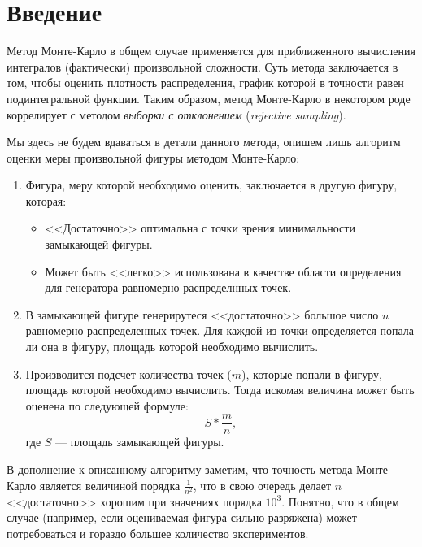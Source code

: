 \section{Введение}

Метод Монте-Карло в общем случае применяется для приближенного вычисления интегралов (фактически) произвольной сложности. Суть метода
заключается в том, чтобы оценить плотность распределения, график которой в точности равен подинтегральной функции. Таким образом, 
метод Монте-Карло в некотором роде коррелирует с методом \emph{выборки с отклонением} (\emph{rejective sampling}). 

Мы здесь не будем вдаваться в детали данного метода, опишем лишь алгоритм оценки меры произвольной фигуры методом Монте-Карло:
\begin{enumerate}
    \item Фигура, меру которой необходимо оценить, заключается в другую фигуру, которая:
        \begin{itemize}
            \item <<Достаточно>> оптимальна с точки зрения минимальности замыкающей фигуры.
            \item Может быть <<легко>> использована в качестве области определения для генератора равномерно распределнных точек.
        \end{itemize}  
    \item В замыкающей фигуре генерирутеся <<достаточно>> большое число $n$ равномерно распределенных точек. Для каждой из точки 
        определяется попала ли она в фигуру, площадь которой необходимо вычислить.
    \item Производится подсчет количества точек ($m$), которые попали в фигуру, площадь которой необходимо вычислить. Тогда
        искомая величина может быть оценена по следующей формуле:
        \begin{equation*}
            S * \frac{m}{n},
        \end{equation*}
        где $S$ --- площадь замыкающей фигуры.
\end{enumerate}
В дополнение к описанному алгоритму заметим, что точность метода Монте-Карло является величиной порядка $\frac{1}{n^2}$, что в свою 
очередь делает $n$ <<достаточно>> хорошим при значениях порядка $10^3$. Понятно, что в общем случае (например, если оцениваемая фигура 
сильно разряжена) может потребоваться и гораздо большее количество экспериментов.